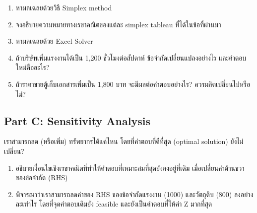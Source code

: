 \begin{enumerate}
    

    \item หาผลเฉลยด้วยวิธี Simplex method
    \item จงอธิบายความหมายทางเรขาคณิตของแต่ละ simplex tableau ที่ได้ในข้อที่ผ่านมา
    \item หาผลเฉลยด้วย Excel Solver
    \item ถ้าบริษัทเพิ่มแรงงานได้เป็น 1,200 ชั่วโมงต่อสัปดาห์ ข้อจำกัดเปลี่ยนแปลงอย่างไร และคำตอบใหม่คืออะไร?
    \item ถ้าราคาขายตู้เก็บเอกสารเพิ่มเป็น 1,800 บาท จะมีผลต่อคำตอบอย่างไร? ควรผลิตเปลี่ยนไปหรือไม่?
\end{enumerate}

\subsection*{Part C: Sensitivity Analysis}
เราสามารถลด (หรือเพิ่ม) ทรัพยากรได้แค่ไหน โดยที่คำตอบที่ดีที่สุด (optimal solution) ยังไม่เปลี่ยน?
\begin{enumerate}
    \item อธิบายเงื่อนไขเชิงเรขาคณิตที่ทำให้คำตอบที่เหมาะสมที่สุดยังคงอยู่ที่เดิม เมื่อเปลี่ยนค่าด้านขวาของข้อจำกัด (RHS)
    \item พิจารณาว่าเราสามารถลดค่าของ RHS ของข้อจำกัดแรงงาน (1000) และวัตถุดิบ (800) ลงอย่างละเท่าไร โดยที่จุดคำตอบเดิมยัง feasible และยังเป็นคำตอบที่ให้ค่า Z มากที่สุด
\end{enumerate}

